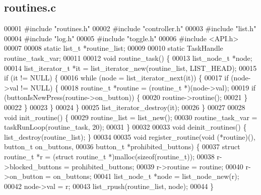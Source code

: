 \subsection{routines.\+c}
\label{routines_8c_source}

\begin{DoxyCode}
00001 \textcolor{preprocessor}{#include "routines.h"}
00002 \textcolor{preprocessor}{#include "controller.h"}
00003 \textcolor{preprocessor}{#include "list.h"}
00004 \textcolor{preprocessor}{#include "log.h"}
00005 \textcolor{preprocessor}{#include "toggle.h"}
00006 \textcolor{preprocessor}{#include <API.h>}
00007 
00008 \textcolor{keyword}{static} list_t *routine_list;
00009 
00010 \textcolor{keyword}{static} TaskHandle routine_task_var;
00011 
00012 \textcolor{keywordtype}{void} routine_task() \{
00013   list_node_t *node;
00014   list_iterator_t *it = list_iterator_new(routine\_list, LIST_HEAD);
00015   \textcolor{keywordflow}{if} (it != NULL) \{
00016     \textcolor{keywordflow}{while} (node = list_iterator_next(it)) \{
00017       \textcolor{keywordflow}{if} (node->val != NULL) \{
00018         routine_t *routine = (routine_t *)(node->val);
00019         \textcolor{keywordflow}{if} (buttonIsNewPress(routine->on_button)) \{
00020           routine->routine();
00021         \}
00022       \}
00023     \}
00024   \}
00025   list_iterator_destroy(it);
00026 \}
00027 
00028 \textcolor{keywordtype}{void} init_routine() \{
00029   routine\_list = list_new();
00030   routine_task_var = taskRunLoop(routine_task, 20);
00031 \}
00032 
00033 \textcolor{keywordtype}{void} deinit_routines() \{ list_destroy(routine\_list); \}
00034 
00035 \textcolor{keywordtype}{void} register_routine(\textcolor{keywordtype}{void} (*routine)(), button_t on\_buttons,
00036                       button_t *prohibited\_buttons) \{
00037   \textcolor{keyword}{struct }routine_t *r = (\textcolor{keyword}{struct }routine_t *)malloc(\textcolor{keyword}{sizeof}(routine_t));
00038   r->blocked_buttons = prohibited\_buttons;
00039   r->routine = routine;
00040   r->on_button = on\_buttons;
00041   list_node_t *node = list_node_new(r);
00042   node->val = r;
00043   list_rpush(routine\_list, node);
00044 \}
\end{DoxyCode}
